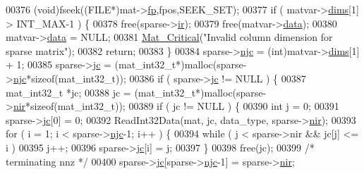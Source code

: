 \begin{DoxyCode}
{00376                 (void)fseek((FILE*)mat->\hyperlink{struct__mat__t_a85f562e407ca9ad4d2a6e14f839432b7}{fp},fpos,SEEK\_SET);
00377                 \textcolor{keywordflow}{if} ( matvar->\hyperlink{group___m_a_t_a8e01234e1c862ce3472bb37f5a09b92c}{dims}[1] > INT\_MAX-1 ) \{
00378                     free(sparse->\hyperlink{group___m_a_t_a8d4c863d704edddec5cbfa15b2d719c8}{ir});
00379                     free(matvar->\hyperlink{group___m_a_t_a5672978efa230bbdecdf38ede781f7fa}{data});
00380                     matvar->\hyperlink{group___m_a_t_a5672978efa230bbdecdf38ede781f7fa}{data} = NULL;
00381                     \hyperlink{group__mat__util_gaf51f2bfbb5580f575e4dd79757e2b80c}{Mat\_Critical}(\textcolor{stringliteral}{"Invalid column dimension for sparse matrix"});
00382                     \textcolor{keywordflow}{return};
00383                 \}
00384                 sparse->\hyperlink{group___m_a_t_a482d8e4b40aa975f0c1daf146ebe08a4}{njc} = (int)matvar->\hyperlink{group___m_a_t_a8e01234e1c862ce3472bb37f5a09b92c}{dims}[1] + 1;
00385                 sparse->\hyperlink{group___m_a_t_ad1e74cdc4f7eff1e47a670297c01da4b}{jc} = (mat\_int32\_t*)malloc(sparse->\hyperlink{group___m_a_t_a482d8e4b40aa975f0c1daf146ebe08a4}{njc}*\textcolor{keyword}{sizeof}(mat\_int32\_t));
00386                 \textcolor{keywordflow}{if} ( sparse->\hyperlink{group___m_a_t_ad1e74cdc4f7eff1e47a670297c01da4b}{jc} != NULL ) \{
00387                     mat\_int32\_t *jc;
00388                     jc = (mat\_int32\_t*)malloc(sparse->\hyperlink{group___m_a_t_aa64636ad57cf87f7a28ff5018437a850}{nir}*\textcolor{keyword}{sizeof}(mat\_int32\_t));
00389                     \textcolor{keywordflow}{if} ( jc != NULL ) \{
00390                         \textcolor{keywordtype}{int} j = 0;
00391                         sparse->\hyperlink{group___m_a_t_ad1e74cdc4f7eff1e47a670297c01da4b}{jc}[0] = 0;
00392                         ReadInt32Data(mat, jc, data\_type, sparse->\hyperlink{group___m_a_t_aa64636ad57cf87f7a28ff5018437a850}{nir});
00393                         \textcolor{keywordflow}{for} ( i = 1; i < sparse->\hyperlink{group___m_a_t_a482d8e4b40aa975f0c1daf146ebe08a4}{njc}-1; i++ ) \{
00394                             \textcolor{keywordflow}{while} ( j < sparse->nir && jc[j] <= i )
00395                                 j++;
00396                             sparse->\hyperlink{group___m_a_t_ad1e74cdc4f7eff1e47a670297c01da4b}{jc}[i] = j;
00397                         \}
00398                         free(jc);
00399                         \textcolor{comment}{/* terminating nnz */}
00400                         sparse->\hyperlink{group___m_a_t_ad1e74cdc4f7eff1e47a670297c01da4b}{jc}[sparse->\hyperlink{group___m_a_t_a482d8e4b40aa975f0c1daf146ebe08a4}{njc}-1] = sparse->\hyperlink{group___m_a_t_aa64636ad57cf87f7a28ff5018437a850}{nir};
}
\end{DoxyCode}
